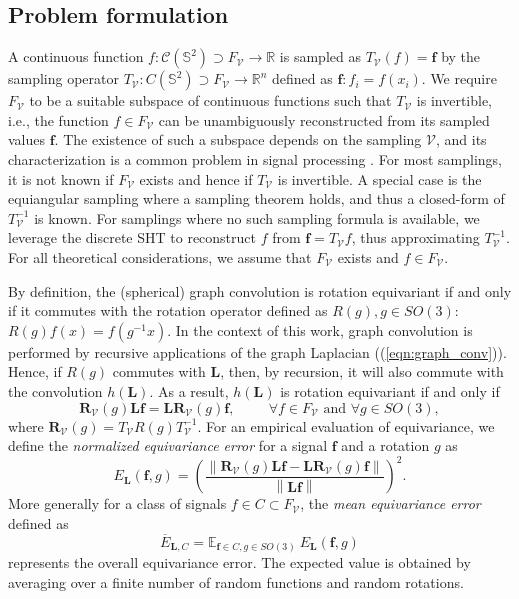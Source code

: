 \documentclass{article} %
\newcommand{\norm}[1]{\left\lVert#1\right\rVert}
\renewcommand{\b}[1]{{\bm{#1}}}  %
\newcommand{\R}{\mathbb{R}}
\renewcommand{\S}{\mathbb{S}}
\newcommand{\V}{\mathcal{V}}  %
\newcommand{\eqnref}[1]{(\ref{eqn:#1})}
\begin{document}
\subsection{Problem formulation}
A continuous function $f : \mathcal C(\S^2) \supset F_\V \to \R$ is sampled as $T_\V(f) = \b{f}$ by the sampling operator $T_\V: C(\S^2) \supset F_\V \to \R^n$ defined as $\b{f}: f_i=f(x_i)$. We require $F_\V$ to be a suitable subspace of continuous functions such that $T_\V$ is invertible, i.e., the function $f \in F_\V$ can be unambiguously reconstructed from its sampled values $\b{f}$.
The existence of such a subspace depends on the sampling $\V$, and its characterization is a common problem in signal processing \citep{driscoll1994Fouriersphere}.
For most samplings, it is not known if $F_\V$ exists and hence if $T_\V$ is invertible.
A special case is the equiangular sampling where a sampling theorem holds, and thus a closed-form of $T_\V^{-1}$ is known. %
For samplings where no such sampling formula is available, we leverage the discrete SHT to reconstruct $f$ from $\b{f}=T_\V f$, thus approximating $T_\V^{-1}$.
For all theoretical considerations, we assume that $F_\V$ exists and $f \in F_\V$.

By definition, the (spherical) graph convolution is rotation equivariant if and only if it commutes with the rotation operator defined as $R(g), g\in SO(3)$: $R(g) f(x) = f\left(g^{-1} x \right)$.
In the context of this work, graph convolution is performed by recursive applications of the graph Laplacian (\eqnref{graph_conv}).
Hence, if $R(g)$ commutes with $\b{L}$, then, by recursion, it will also commute with the convolution $h(\b{L})$.
As a result, $h(\b{L})$ is rotation equivariant if and only if
\begin{equation*} %
	\b{R}_\V(g) \b{L} \b{f} = \b{L} \b{R}_\V(g) \b{f}, \hspace{1cm} \forall f\in F_\V \text{ and } \forall g\in SO(3),
\end{equation*}
where $\b{R}_\V(g) = T_\V R(g) T_\V^{-1}$.
For an empirical evaluation of equivariance, we define the \textit{normalized equivariance error} for a signal $\b{f}$ and a  rotation $g$ as
\begin{equation} \label{eq:equivariance error}
	E_{\b{L}}(\b{f}, g) = \left(\frac{ \norm {\b{R}_\V(g) \b{L} \b{f} - \b{L} \b{R}_\V(g) \b{f}} }{\norm {\b{L} \b{f}}}\right)^2.
\end{equation}
More generally for a class of signals $f \in C \subset F_\V$, the \textit{mean equivariance error} defined as
\begin{equation} \label{eq:mean equivariance error}
	\overline E_{\b{L}, C} = \mathbb E_{\b{f}\in C, g\in SO(3)} \ E_{\b{L}}(\b{f}, g)
\end{equation}
represents the overall equivariance error.
The expected value is obtained by averaging over a finite number of random functions and random rotations.
\end{document}
